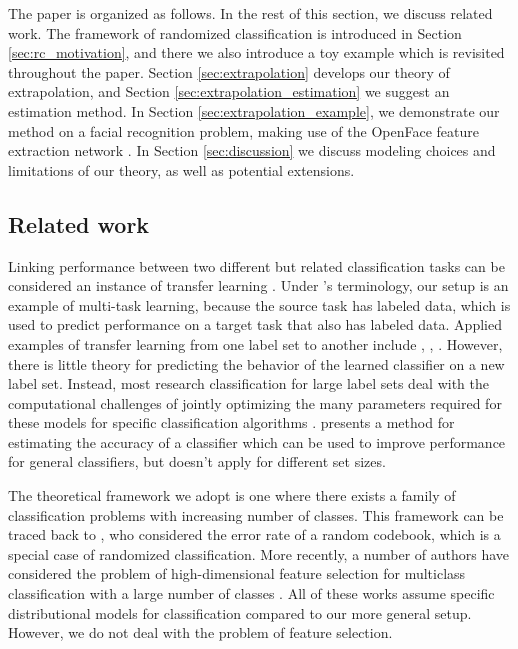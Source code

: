 \documentclass[twoside,11pt]{article}
\begin{document}
The paper is organized as follows.  In the rest of this section, we
discuss related work.  The framework of randomized classification is
introduced in Section \ref{sec:rc_motivation}, and there we also
introduce a toy example which is revisited throughout the
paper. Section \ref{sec:extrapolation} develops our theory of
extrapolation, and Section \ref{sec:extrapolation_estimation} we
suggest an estimation method. In Section
\ref{sec:extrapolation_example}, we demonstrate our method on a facial
recognition problem, making use of the OpenFace feature extraction
network \cite{amos2016openface}. In Section \ref{sec:discussion} we
discuss modeling choices and limitations of our theory, as well as
potential extensions.

\subsection{Related work}

Linking performance between two different but related classification
tasks can be considered an instance of transfer learning
\citep{pan2010survey}. Under \citeauthor{pan2010survey}'s terminology,
our setup is an example of multi-task learning, because the source
task has labeled data, which is used to predict performance on a
target task that also has labeled data. Applied examples of transfer learning from one label set to another include \cite{oquab2014learning},
\cite{donahue2014decaf}, \cite{sharif2014cnn}. 
However, there is little theory for predicting the behavior of the learned classifier on a new label set. Instead, most research classification for large label sets deal with the computational challenges of jointly optimizing the many parameters
required for these models for specific classification algorithms \citep{crammer2001algorithmic,
  lee2004multicategory, weston1999support}. \cite{gupta2014training}
presents a method for estimating the accuracy of a classifier which can
be used to improve performance for general classifiers, but doesn't apply for different set sizes.  

The theoretical framework we adopt is one where there exists a family
of classification problems with increasing number of classes. This
framework can be traced back to \cite{Shannon1948}, who considered the error rate of a random codebook, which is a special case of randomized classification. More recently, a number of authors have considered the problem of high-dimensional feature selection for multiclass
classification with a large number of classes \citep{pan2016ultrahigh,
  abramovich2015feature, davis2011bayesian}.  All of these works
assume specific distributional models for classification compared to
our more general setup. However, we do not deal with the problem of
feature selection.
\end{document}
